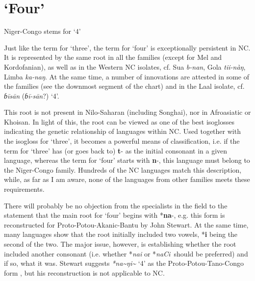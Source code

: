 \section{‘Four’}%
\begin{table}
\caption{\label{tab:4:13}Niger-Congo stems for `4'}
\kppyramid
{}




 
\end{table}

Just like the term for ‘three’, the term for ‘four’ is exceptionally persistent in NC. It is represented by the same root in all the families (except for Mel and Kordofanian), as well as in the Western NC isolates, cf. Sua \textit{b-nan}, Gola \textit{tii-nàŋ}, Limba \textit{ka-naŋ}. At the same time, a number of innovations are attested in some of the families (see the downmost segment of the chart) and in the Laal isolate, cf. \textit{ɓi\={}sa\={}n} (\textit{ɓi\={}-sa\={}n}?) ‘4’.

This root is not present in Nilo-Saharan (including Songhai), nor in Afroasiatic or Khoisan. In light of this, the root can be viewed as one of the best isoglosses indicating the genetic relationship of languages within NC. Used together with the isogloss for ‘three’, it becomes a powerful means of classification, i.e. if the term for ‘three’ has (or goes back to) \textbf{t}- as the initial consonant in a given language, whereas the term for ‘four’ starts with \textbf{n}-, this language must belong to the Niger-Congo family. Hundreds of the NC languages match this description, while, as far as I am aware, none of the languages from other families meets these requirements.

There will probably be no objection from the specialists in the field to the statement that the main root for ‘four’ begins with *\textbf{na}-, e.g. this form is reconstructed for Proto-Potou-Akanic-Bantu by John Stewart. At the same time, many languages show that the root initially included two vowels, *\textbf{i} being the second of the two. The major issue, however, is establishing whether the root included another consonant (i.e. whether *\textit{nai} or *\textit{naCi~}should be preferred) and if so, what it was. Stewart suggests \textit{*na\~{}ŋi\~{}}  ‘4’ as the Proto-Potou-Tano-Congo form \citep{Stewart1983}, but his reconstruction is not applicable to NC.

